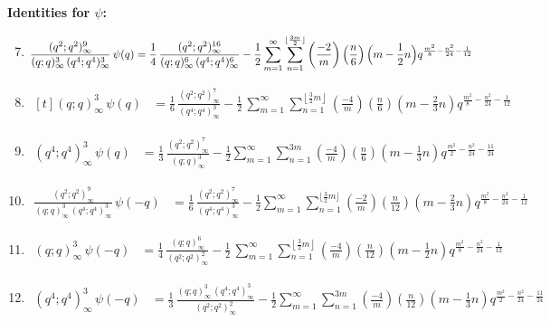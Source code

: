 \documentclass[11pt,reqno]{amsart}
\renewcommand{\=}{\;=\;}
\theoremstyle{myremark}
\begin{document}
\bigskip
\textbf{Identities for $\psi$:}
\begin{enumerate}[label=II.\arabic*.,ref=II.\arabic*, itemsep=1em]
\setcounter{enumi}{6}
\item $\displaystyle
\begin{aligned}
\frac{(q^2;q^2)_\infty^9}{(q;q)_\infty^3\,(q^4;q^4)_\infty^3}\,\psi(q)
&=
\frac{1}{4}\,\frac{(q^2;q^2)_\infty^{16}}{(q;q)_\infty^6\,(q^4;q^4)_\infty^6}
-\frac{1}{2}\sum_{m=1}^\infty \sum_{n=1}^{\lfloor {3m \over 2} \rfloor} \left( {-2 \over m} \right) \left( {n \over 6} \right) \Big( m - \frac{1}{2}n \Big) q^{{m^2 \over 8} - {n^2 \over 24} - {1 \over 12}}
\end{aligned}\label{7}
$
\item $\displaystyle
\begin{aligned}[t]
(q;q)_\infty^3\,\psi(q)
&=
\frac{1}{6}\,\frac{(q^2;q^2)_\infty^7}{(q^4;q^4)_\infty^3} - \frac{1}{2}\,
\sum_{m=1}^\infty\sum_{n=1}^{\left\lfloor \frac{3}{2}m \right\rfloor} \left(\frac{-4}{m}\right)\left(\frac{n}{6}\right)\left(m-\frac{2}{3}n\right)
q^{\frac{m^2}{8}-\frac{n^2}{24}-\frac{1}{12}}
\end{aligned}\label{8}
$
\item $\displaystyle
\begin{aligned}
(q^4;q^4)_\infty^3\,\psi(q)
&=
\frac{1}{3}\,\frac{(q^2;q^2)_\infty^7}{(q;q)_\infty^3}
-\frac{1}{2}\sum_{m=1}^\infty\sum_{n=1}^{3m}
\left(\frac{-4}{m}\right)\left(\frac{n}{6}\right)\left(m-\frac{1}{3}n\right)
q^{\frac{m^2}{2}-\frac{n^2}{24}-\frac{11}{24}}
\end{aligned}\label{9}
$
\item $\displaystyle
\begin{aligned}
\frac{(q^2;q^2)_\infty^9}{(q;q)_\infty^3\,(q^4;q^4)_\infty^3}\,\psi(-q)
&=
\frac{1}{6}\,\frac{(q^2;q^2)_\infty^{7}}{(q^4;q^4)_\infty^3}
-\frac{1}{2}\sum_{m=1}^\infty\sum_{n=1}^{\lfloor \frac{3}{2}m \rfloor}
\left(\frac{-2}{m}\right)\left(\frac{n}{12}\right)\left(m-\frac{2}{3}n\right)
q^{\frac{m^2}{8}-\frac{n^2}{24}-\frac{1}{12}}
\end{aligned}\label{10}
$
\item $\displaystyle
\begin{aligned}
(q;q)_\infty^3\,\psi(-q)
&=
\frac{1}{4}\,\frac{(q;q)_\infty^6}{(q^2;q^2)_\infty^2}-\frac{1}{2}\,
\sum_{m=1}^\infty\sum_{n=1}^{\left\lfloor \frac{3}{2}m \right\rfloor}
\left(\frac{-4}{m}\right)\left(\frac{n}{12}\right)\left(m-\frac{1}{2}n\right)
q^{\frac{m^2}{8}-\frac{n^2}{24}-\frac{1}{12}}
\end{aligned}\label{11}
$
\item $\displaystyle
\begin{aligned}
(q^4;q^4)_\infty^3\,\psi(-q)
&=
\frac{1}{3}\,\frac{(q;q)_\infty^3\,(q^4;q^4)_\infty^3}{(q^2;q^2)_\infty^2}
-\frac{1}{2}\sum_{m=1}^\infty\sum_{n=1}^{3m}
\left(\frac{-4}{m}\right)\left(\frac{n}{12}\right)\left(m-\frac{1}{3}n\right)
q^{\frac{m^2}{2}-\frac{n^2}{24}-\frac{11}{24}}
\end{aligned}\label{12}
$
\end{enumerate}
\end{document}

